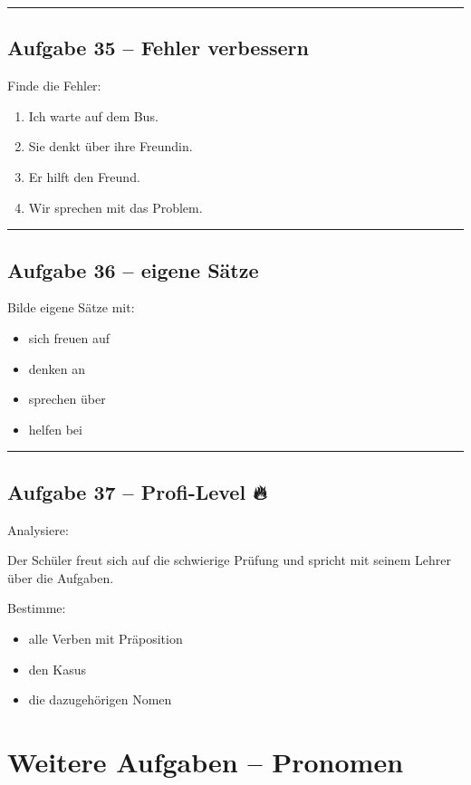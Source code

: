 \documentclass[a4paper,12pt]{article}
\newcommand{\linie}{\vspace{4pt}\hrule\vspace{10pt}}
\begin{document}
\linie

\subsection*{Aufgabe 35 – Fehler verbessern}

Finde die Fehler:

\begin{enumerate}
\item Ich warte auf dem Bus.
\item Sie denkt über ihre Freundin.
\item Er hilft den Freund.
\item Wir sprechen mit das Problem.
\end{enumerate}

\linie

\subsection*{Aufgabe 36 – eigene Sätze}

Bilde eigene Sätze mit:

\begin{itemize}
\item sich freuen auf
\item denken an
\item sprechen über
\item helfen bei
\end{itemize}

\linie

\subsection*{Aufgabe 37 – Profi-Level 🔥}

Analysiere:

Der Schüler freut sich auf die schwierige Prüfung und spricht mit seinem Lehrer über die Aufgaben.

Bestimme:
\begin{itemize}
\item alle Verben mit Präposition
\item den Kasus
\item die dazugehörigen Nomen
\end{itemize}

\newpage
\section*{Weitere Aufgaben – Pronomen}
\end{document}
